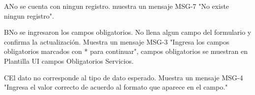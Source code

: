 		\begin{UCtrayectoriaA}{A}{No se cuenta con ningun registro.}
		\UCpaso muestra un mensaje MSG-7 "No existe ningun registro".
		\end{UCtrayectoriaA}

		\begin{UCtrayectoriaA}{B}{No se ingresaron los campos obligatorios.}
			\UCpaso[\UCactor] No llena algun campo del formulario y confirma la actualización.
			\UCpaso Muestra un mensaje MSG-3 "Ingresa los campos obligatorios marcados con * para continuar", campos obligatorios se muestran en Plantilla UI campos Obligatorios Servicios.
		\end{UCtrayectoriaA}

		\begin{UCtrayectoriaA}{C}{El dato no corresponde al tipo de dato esperado.}
			\UCpaso Muestra un mensaje MSG-4 "Ingresa el valor correcto de acuerdo al formato que aparece en el campo."
		\end{UCtrayectoriaA}
	
